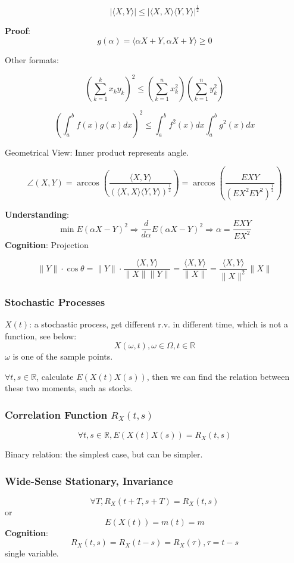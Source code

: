 \documentclass[a4paper]{article}
\begin{document}
$$|\langle X, Y\rangle|\leq|\langle X,X\rangle\langle Y,Y\rangle|^{\frac 12}$$

\textbf{Proof}:
$$g(\alpha)=\langle \alpha X+Y,\alpha X+Y\rangle\geq 0$$

Other formats:

$$(\sum_{k=1}^k x_ky_k)^2 \leq (\sum_{k=1}^n x_k^2)(\sum_{k=1}^ny_k^2)$$

$$(\int_a^b f(x)g(x)dx)^2\leq\int_a^bf^2(x)dx\int_a^bg^2(x)dx$$

Geometrical View: Inner product represents angle.

$$\angle(X, Y)=\arccos \left(\frac{\langle X,Y\rangle}{(\langle X,X\rangle\langle Y,Y\rangle)^{\frac 12}}\right)=\arccos \left(\frac{EXY}{(EX^2EY^2)^{\frac 12}}\right)$$

\textbf{Understanding}:
$$\min E(\alpha X-Y)^2 \Rightarrow \frac{d}{d\alpha}E(\alpha X-Y)^2\Rightarrow\alpha = \frac{EXY}{EX^2}$$
\textbf{Cognition}: Projection
$$\|Y\|\cdot \cos\theta=\|Y\|\cdot\frac{\langle X,Y\rangle}{\|X\| \|Y\|}=\frac{\langle X,Y\rangle}{\|X\|}=\frac{\langle X,Y\rangle}{\|X\|^2}\|X\|$$

\subsubsection*{Stochastic Processes}
$X(t)$: a stochastic process, get different r.v. in different time, which is not a function, see below:
$$X(\omega, t), \omega\in\Omega, t\in\mathbb{R}$$
$\omega$ is one of the sample points.

$\forall t, s\in\mathbb{R}$, calculate $E(X(t)X(s))$, then we can find the relation between these two moments, such as stocks.
\subsubsection*{Correlation Function $R_X(t,s)$}
$$\forall t, s\in\mathbb{R}, E(X(t)X(s))=R_X(t,s)$$

Binary relation: the simplest case, but can be simpler.

\subsubsection*{Wide-Sense Stationary, Invariance}
$$\forall T, R_X(t+T, s+T) = R_X(t,s)$$
or $$E(X(t))=m(t)=m$$
\textbf{Cognition}:
$$R_X(t,s)=R_X(t-s)=R_X(\tau), \tau=t-s$$
single variable.
\end{document}
